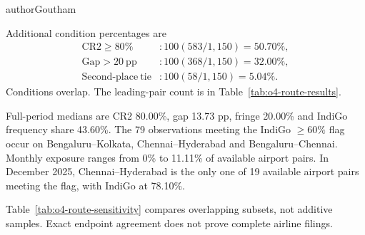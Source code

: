 \begin{mergedcontribution}{authorGoutham}

\label{app:o4-route-checks}
Additional condition percentages are
\[
\begin{aligned}
\mathrm{CR2}\geq80\% &: 100(583/1{,}150)=50.70\%,\\
\mathrm{Gap}>20\ \mathrm{pp} &: 100(368/1{,}150)=32.00\%,\\
\mathrm{Second\mbox{-}place\ tie} &: 100(58/1{,}150)=5.04\%.
\end{aligned}
\]
Conditions overlap. The leading-pair count is in Table~\ref{tab:o4-route-results}.

Full-period medians are CR2 80.00\%, gap 13.73 pp, fringe 20.00\% and IndiGo frequency share 43.60\%. The 79 observations meeting the IndiGo $\geq60\%$ flag occur on Bengaluru--Kolkata, Chennai--Hyderabad and Bengaluru--Chennai. Monthly exposure ranges from 0\% to 11.11\% of available airport pairs. In December 2025, Chennai--Hyderabad is the only one of 19 available airport pairs meeting the flag, with IndiGo at 78.10\%.

Table~\ref{tab:o4-route-sensitivity} compares overlapping subsets, not additive samples. Exact endpoint agreement does not prove complete airline filings.


\end{mergedcontribution}
